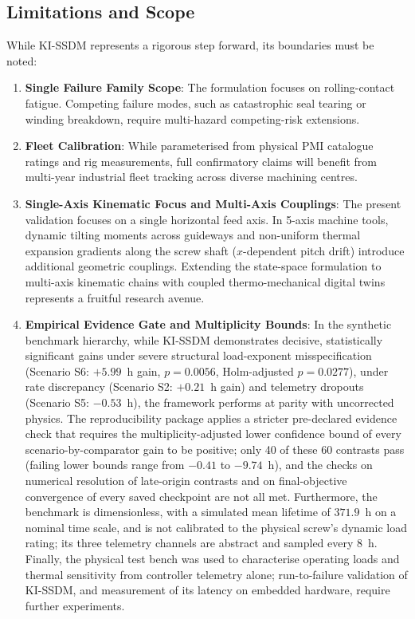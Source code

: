 \documentclass[a4paper,fleqn]{cas-dc}
\begin{document}
\subsection{Limitations and Scope}
\label{subsec:limitations}

While KI-SSDM represents a rigorous step forward, its boundaries must be noted:
\begin{enumerate}[label=(\alph*),leftmargin=2.2em]
    \item \textbf{Single Failure Family Scope}: The formulation focuses on rolling-contact fatigue. Competing failure modes, such as catastrophic seal tearing or winding breakdown, require multi-hazard competing-risk extensions.
    \item \textbf{Fleet Calibration}: While parameterised from physical PMI catalogue ratings and rig measurements, full confirmatory claims will benefit from multi-year industrial fleet tracking across diverse machining centres.
    \item \textbf{Single-Axis Kinematic Focus and Multi-Axis Couplings}: The present validation focuses on a single horizontal feed axis. In 5-axis machine tools, dynamic tilting moments across guideways and non-uniform thermal expansion gradients along the screw shaft ($x$-dependent pitch drift) introduce additional geometric couplings. Extending the state-space formulation to multi-axis kinematic chains with coupled thermo-mechanical digital twins represents a fruitful research avenue.
    \item \textbf{Empirical Evidence Gate and Multiplicity Bounds}: In the synthetic benchmark hierarchy, while KI-SSDM demonstrates decisive, statistically significant gains under severe structural load-exponent misspecification (Scenario S6: $+5.99$~h gain, $p = 0.0056$, Holm-adjusted $p = 0.0277$), under rate discrepancy (Scenario S2: $+0.21$~h gain) and telemetry dropouts (Scenario S5: $-0.53$~h), the framework performs at parity with uncorrected physics. The reproducibility package applies a stricter pre-declared evidence check that requires the multiplicity-adjusted lower confidence bound of every scenario-by-comparator gain to be positive; only 40 of these 60 contrasts pass (failing lower bounds range from $-0.41$ to $-9.74$~h), and the checks on numerical resolution of late-origin contrasts and on final-objective convergence of every saved checkpoint are not all met. Furthermore, the benchmark is dimensionless, with a simulated mean lifetime of $371.9$~h on a nominal time scale, and is not calibrated to the physical screw's dynamic load rating; its three telemetry channels are abstract and sampled every 8~h. Finally, the physical test bench was used to characterise operating loads and thermal sensitivity from controller telemetry alone; run-to-failure validation of KI-SSDM, and measurement of its latency on embedded hardware, require further experiments.
\end{enumerate}
\end{document}
